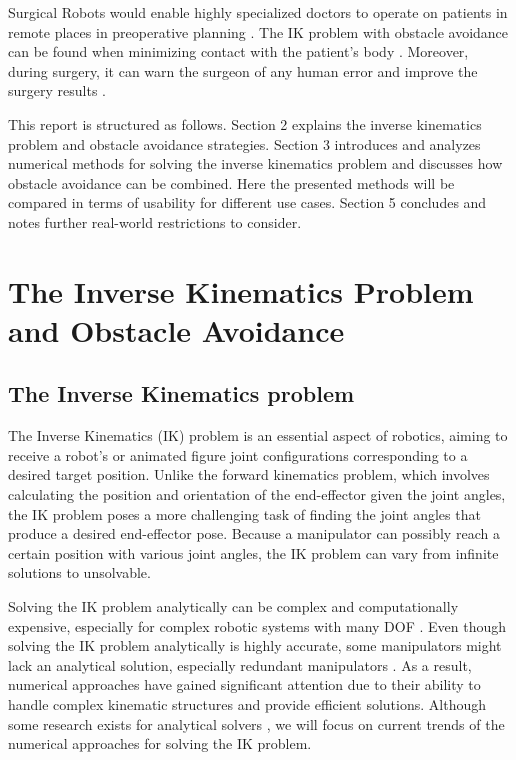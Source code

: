 \documentclass[conference]{IEEEtran}
\begin{document}
Surgical Robots would enable highly specialized doctors to operate on patients in remote places \cite{guthart_intuitivesup_2000} in preoperative planning \cite{hayashibe_preoperative_2005}. The IK problem with obstacle avoidance can be found when minimizing contact with the patient's body \cite{berthet-rayne_inverse_2018}. Moreover, during surgery, it can warn the surgeon of any human error and improve the surgery results \cite{kavoussi_comparison_1995}.

This report is structured as follows. Section 2 explains the inverse kinematics problem and obstacle avoidance strategies. Section 3 introduces and analyzes numerical methods for solving the inverse kinematics problem and discusses how obstacle avoidance can be combined. Here the presented methods will be compared in terms of usability for different use cases. Section 5 concludes and notes further real-world restrictions to consider.





\section{The Inverse Kinematics Problem and Obstacle Avoidance}
\subsection{The Inverse Kinematics problem}
The Inverse Kinematics (IK) problem is an essential aspect of robotics, aiming to receive a robot's or animated figure joint configurations corresponding to a desired target position. Unlike the forward kinematics problem, which involves calculating the position and orientation of the end-effector given the joint angles, the IK problem poses a more challenging task of finding the joint angles that produce a desired end-effector pose. Because a manipulator can possibly reach a certain position with various joint angles, the IK problem can vary from infinite solutions to unsolvable.

Solving the IK problem analytically can be complex and computationally expensive, especially for complex robotic systems with many DOF \cite{shimizu_analytical_2008}. Even though solving the IK problem analytically is highly accurate, some manipulators might lack an analytical solution, especially redundant manipulators \cite{conkur_buckingham_1997}. As a result, numerical approaches have gained significant attention due to their ability to handle complex kinematic structures and provide efficient solutions. Although some research exists for analytical solvers \cite{chen_analyticalSolver} \cite{manocha_analyticalSolver}, we will focus on current trends of the numerical approaches for solving the IK problem. 
\end{document}
